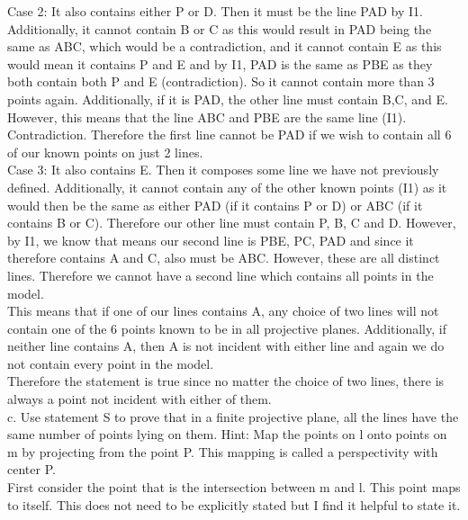 \documentclass[12pt,letterpaper]{article}
\begin{document}
Case 2: It also contains either P or D.  Then it must be the line PAD by I1.  Additionally, it cannot contain B or C as this would result in PAD being the same as ABC, which would be a contradiction, and it cannot contain E as this would mean it contains P and E and by I1, PAD is the same as PBE as they both contain both P and E (contradiction).  So it cannot contain more than 3 points again.  Additionally, if it is PAD, the other line must contain B,C, and E.  However, this means that the line ABC and PBE are the same line (I1).  Contradiction.  Therefore the first line cannot be PAD if we wish to contain all 6 of our known points on just 2 lines. \\

Case 3: It also contains E. Then it composes some line we have not previously defined.  Additionally, it cannot contain any of the other known points (I1) as it would then be the same as either PAD (if it contains P or D) or ABC (if it contains B or C).  Therefore our other line must contain P, B, C and D.  However, by I1, we know that means our second line is PBE, PC, PAD and since it therefore contains A and C, also must be ABC.  However, these are all distinct lines. Therefore we cannot have a second line which contains all points in the model.\\

This means that if one of our lines contains A, any choice of two lines will not contain one of the 6 points known to be in all projective planes.  Additionally, if neither line contains A, then A is not incident with either line and again we do not contain every point in the model.\\

Therefore the statement is true since no matter the choice of two lines, there is always a point not incident with either of them.\\





c. Use statement S to prove that in a finite projective plane, all the lines have the same number of points lying on them.  Hint: Map the points on l onto points on m by projecting from the point P.  This mapping is called a perspectivity with center P.\\

First consider the point that is the intersection between m and l.  This point maps to itself.  This does not need to be explicitly stated but I find it helpful to state it.\\
\end{document}
